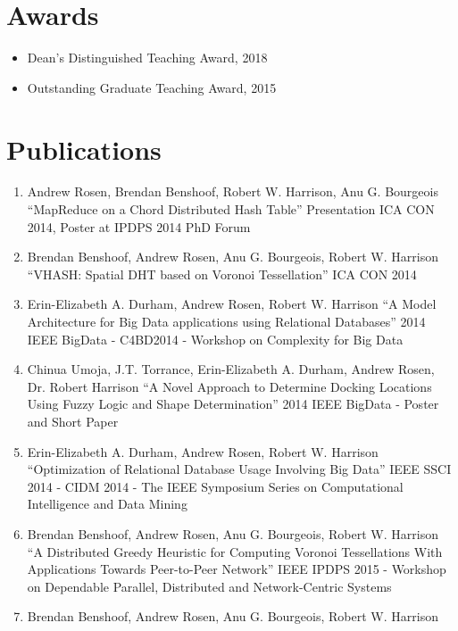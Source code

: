 \documentclass{res}
\begin{document}
\begin{resume}
\begin{itemize}
    \end{itemize}   





\section{Awards}
\begin{itemize}    
	\item Dean's Distinguished Teaching Award, 2018
	\item Outstanding Graduate Teaching Award, 2015
\end{itemize}   


\section{Publications}
	\begin{enumerate}
	\item Andrew Rosen, Brendan Benshoof, Robert W. Harrison, Anu G. Bourgeois
			``MapReduce on a Chord Distributed Hash Table''
			Presentation ICA CON 2014, Poster at IPDPS 2014 PhD Forum
	\item Brendan Benshoof, Andrew Rosen, Anu G. Bourgeois, Robert W. Harrison
			``VHASH: Spatial DHT based on Voronoi Tessellation''
			ICA CON 2014
	\item  Erin-Elizabeth A. Durham, Andrew Rosen, Robert W. Harrison
    ``A Model Architecture for Big Data applications using Relational Databases''
    2014 IEEE BigData - C4BD2014 - Workshop on Complexity for Big Data
    \item Chinua Umoja, J.T. Torrance, Erin-Elizabeth A. Durham, Andrew Rosen, Dr. Robert Harrison
    	``A Novel Approach to Determine Docking Locations Using Fuzzy Logic and Shape Determination''
    	2014 IEEE BigData - Poster and Short Paper
    \item  Erin-Elizabeth A. Durham, Andrew Rosen, Robert W. Harrison
    ``Optimization of Relational Database Usage Involving Big Data''
     IEEE SSCI 2014 - CIDM 2014 - The IEEE Symposium Series on Computational Intelligence and Data Mining
	\item Brendan Benshoof, Andrew Rosen, Anu G. Bourgeois, Robert W. Harrison
	 ``A Distributed Greedy Heuristic for Computing Voronoi Tessellations With Applications Towards Peer-to-Peer Network''
	IEEE IPDPS 2015 - Workshop on Dependable Parallel, Distributed and Network-Centric Systems
	\item Brendan Benshoof, Andrew Rosen, Anu G. Bourgeois, Robert W. Harrison

\end{enumerate}
\end{resume}
\end{document}
